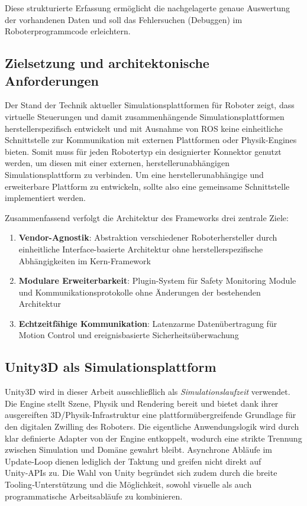 Diese strukturierte Erfassung ermöglicht die nachgelagerte genaue Auswertung der
vorhandenen Daten und soll das Fehlersuchen (Debuggen) im Roboterprogrammcode
erleichtern.

\subsection{Zielsetzung und architektonische Anforderungen}
Der Stand der Technik aktueller Simulationsplattformen für Roboter zeigt, dass
virtuelle Steuerungen und damit zusammenhängende Simulationsplattformen
herstellerspezifisch entwickelt und mit Ausnahme von ROS keine einheitliche
Schnittstelle zur Kommunikation mit externen Plattformen oder Physik-Engines
bieten. Somit muss für jeden Robotertyp ein designierter Konnektor genutzt
werden, um diesen mit einer externen, herstellerunabhängigen
Simulationsplattform
zu verbinden. Um eine herstellerunabhängige und erweiterbare Plattform zu
entwickeln, sollte also eine gemeinsame Schnittstelle implementiert werden.

Zusammenfassend verfolgt die Architektur des Frameworks drei zentrale Ziele:
\begin{enumerate}
  \item \textbf{Vendor-Agnostik}: Abstraktion verschiedener
    Roboterhersteller durch einheitliche Interface-basierte
    Architektur ohne herstellerspezifische Abhängigkeiten im Kern-Framework

  \item \textbf{Modulare Erweiterbarkeit}: Plugin-System für Safety
    Monitoring Module und Kommunikationsprotokolle ohne Änderungen
    der bestehenden Architektur

  \item \textbf{Echtzeitfähige Kommunikation}: Latenzarme
    Datenübertragung für Motion Control und ereignisbasierte
    Sicherheitsüberwachung
\end{enumerate}

\subsection{Unity3D als Simulationsplattform}

Unity3D wird in dieser Arbeit ausschließlich als
\emph{Simulations\-laufzeit} verwendet.
Die Engine stellt Szene, Physik und Rendering bereit und bietet dank
ihrer ausgereiften
3D/Physik‑Infrastruktur eine plattformübergreifende Grundlage für den
digitalen Zwilling des Roboters. Die eigentliche
Anwendungslogik wird durch klar definierte Adapter von der Engine entkoppelt,
wodurch eine strikte Trennung zwischen Simulation und Domäne gewahrt bleibt.
Asynchrone Abläufe im Update‑Loop dienen lediglich der Taktung und greifen
nicht direkt auf Unity‑APIs zu. Die Wahl von Unity begründet sich zudem durch
die breite Tooling‑Unterstützung und die Möglichkeit, sowohl visuelle als auch
programmatische Arbeitsabläufe zu kombinieren.

